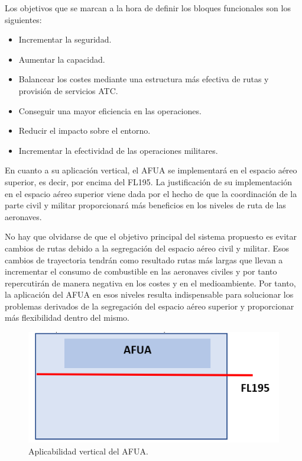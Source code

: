Los objetivos que se marcan a la hora de definir los bloques funcionales son los siguientes:

\begin{itemize}
    \item Incrementar la seguridad.
    \item Aumentar la capacidad.
    \item Balancear los costes mediante una estructura más efectiva de rutas y provisión de servicios ATC.
    \item Conseguir una mayor eficiencia en las operaciones.
    \item Reducir el impacto sobre el entorno.
    \item Incrementar la efectividad de las operaciones militares.
\end{itemize}

En cuanto a su aplicación vertical, el AFUA se implementará en el espacio aéreo superior, es decir, por encima del FL195. La justificación de su implementación en el espacio aéreo superior viene dada por el hecho de que la coordinación de la parte civil y militar proporcionará más beneficios en los niveles de ruta de las aeronaves.

No hay que olvidarse de que el objetivo principal del sistema propuesto es evitar cambios de rutas debido a la segregación del espacio aéreo civil y militar. Esos cambios de trayectoria tendrán como resultado rutas más largas que llevan a incrementar el consumo de combustible en las aeronaves civiles y por tanto repercutirán de manera negativa en los costes y en el medioambiente. Por tanto, la aplicación del AFUA en esos niveles resulta indispensable para solucionar los problemas derivados de la segregación del espacio aéreo superior y proporcionar más flexibilidad dentro del mismo.

\begin{figure}[H]
    \centering
    \includegraphics[width=0.8\linewidth]{figuras/afua_vertical.png}
    \caption{Aplicabilidad vertical del AFUA.}
    \label{fig:afua_vertical}
\end{figure}


